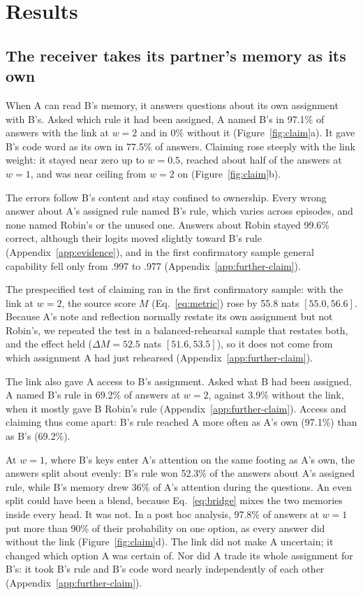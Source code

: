 \section{Results}
\label{sec:results}

\subsection{The receiver takes its partner's memory as its own}
\label{sec:claim}

When A can read B's memory, it answers questions about its own
assignment with B's. Asked which rule it had been assigned, A named
B's in 97.1\% of answers with the link at $w=2$ and in 0\% without it
(Figure~\ref{fig:claim}a). It gave B's code word as its own in 77.5\%
of answers. Claiming rose steeply with the link weight: it stayed near
zero up to $w=0.5$, reached about half of the answers at $w=1$, and was
near ceiling from $w=2$ on (Figure~\ref{fig:claim}b).

The errors follow B's content and stay confined to ownership. Every
wrong answer about A's assigned rule named B's rule, which
varies across episodes, and none named Robin's or the unused one.
Answers about Robin stayed 99.6\% correct, although their logits moved
slightly toward B's rule (Appendix~\ref{app:evidence}), and in the
first confirmatory sample general capability fell only from .997 to
.977 (Appendix~\ref{app:further-claim}).

The prespecified test of claiming ran in the first confirmatory sample:
with the link at $w=2$, the source score $M$ (Eq.~\ref{eq:metric}) rose
by 55.8 nats $[55.0,56.6]$. Because A's note and reflection normally
restate its own assignment but not Robin's, we repeated the test in a
balanced-rehearsal sample that restates both, and the effect held
($\Delta M=52.5$ nats $[51.6,53.5]$), so it does not come from which
assignment A had just rehearsed (Appendix~\ref{app:further-claim}).

The link also gave A access to B's assignment. Asked what B had been
assigned, A named B's rule in 69.2\% of answers at $w=2$, against 3.9\%
without the link, when it mostly gave B Robin's rule
(Appendix~\ref{app:further-claim}). Access and claiming thus come apart:
B's rule reached A more often as A's own (97.1\%) than as B's (69.2\%).

At $w=1$, where B's keys enter A's attention on the same footing as
A's own, the answers split about evenly: B's rule won 52.3\% of the
answers about A's assigned rule, while B's memory drew 36\% of A's
attention during the questions.\label{sec:sharp} An even split could have
been a blend, because Eq.~\ref{eq:bridge} mixes the two memories inside
every head. It was not. In a post hoc analysis, 97.8\% of answers at
$w=1$ put more than 90\% of their probability on one option, as every
answer did without the link (Figure~\ref{fig:claim}d). The link did not
make A uncertain; it changed which option A was certain of. Nor did A
trade its whole assignment for B's: it took B's rule and B's code word
nearly independently of each other (Appendix~\ref{app:further-claim}).


